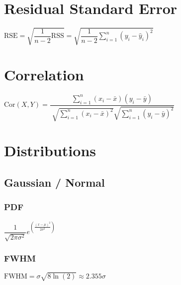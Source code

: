 \section{Residual Standard Error}
\begin{itemize}
\itemt \( \mathrm{RSE} = \sqrt{\dfrac{1}{n-2}\mathrm{RSS}} =\sqrt{\dfrac{1}{n-2}\sum\limits_{i=1}^n (y_i - \hat{y}_i)^2} \)
\end{itemize}



\section{Correlation}
\begin{itemize}
\itemt \( \mathrm{Cor}(X,Y) = \dfrac{\sum\limits_{i=1}^n (x_i - \bar{x})(y_i - \bar{y})}{\sqrt[]{\sum\limits_{i=1}^n (x_i - \bar{x})^2}\sqrt{\sum\limits_{i=1}^n (y_i - \bar{y})^2}} \)
\end{itemize}



\section{Distributions}
\subsection{Gaussian / Normal}
\subsubsection{PDF}
\begin{itemize}
    \itemt \( \dfrac{1}{\sqrt{2\pi\sigma^2}} e^{\left(\frac{(x-\mu)^2}{2\sigma^2}\right)} \)
\end{itemize}
\subsubsection{FWHM}
\begin{itemize}
    \itemt \( \mathrm{FWHM} = \sigma \sqrt{8 \ln(2)} \approx 2.355 \sigma\)
\end{itemize}



